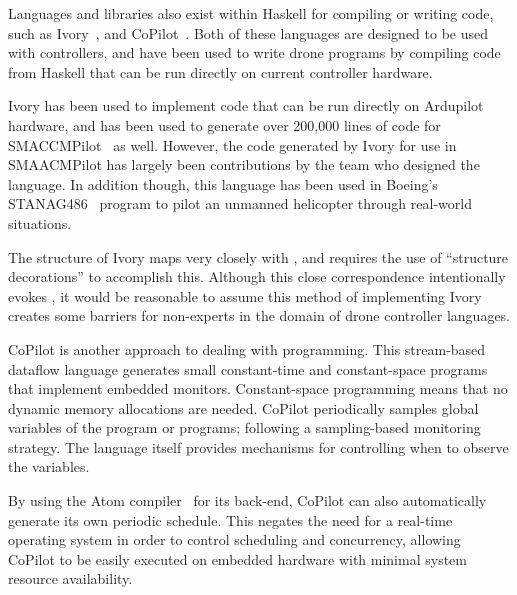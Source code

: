 \documentclass{sig-alternate-05-2015}
\begin{document}
Languages and libraries also exist within Haskell for compiling or writing
 code, such as Ivory~\cite{Eea15ivory}, and
CoPilot~\cite{PGMN10copilot}. Both of these languages are designed to be
used with controllers, and have been used to write drone programs by compiling
 code from Haskell that can be run directly on current controller
hardware.

Ivory has been used to implement code that can be run directly on Ardupilot
hardware, and has been used to generate over 200,000 lines of code for
SMACCMPilot~\cite{Hea14build} as well. However, the code generated by
Ivory for use in SMAACMPilot has largely been contributions by the team who
designed the language. In addition though, this language has been used in
Boeing's STANAG486~\cite{B16little} program to pilot an unmanned
helicopter through real-world situations.


The structure of Ivory maps very closely with , and requires the use
of ``structure decorations'' to accomplish this. Although this close
correspondence intentionally evokes , it would be reasonable to assume
this method of implementing Ivory creates some barriers for non-experts
in the domain of drone controller languages.


CoPilot is another approach to dealing with  programming. This
stream-based dataflow language generates small constant-time and
constant-space  programs that implement embedded
monitors. Constant-space programming means that no dynamic memory allocations
are needed. CoPilot periodically samples global variables of the program or
programs; following a sampling-based monitoring strategy. The language itself
provides mechanisms for controlling when to observe the variables.

By using the Atom compiler~\cite{H08controlling} for its back-end, CoPilot can
also automatically generate its own periodic schedule. This negates the need
for a real-time operating system in order to control scheduling and
concurrency, allowing CoPilot to be easily executed on embedded hardware with
minimal system resource availability.
\end{document}
